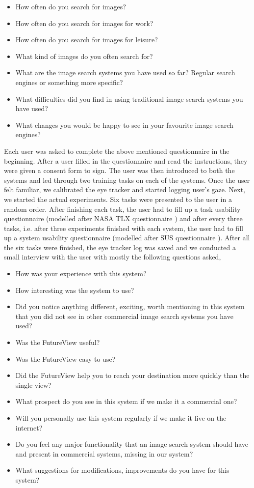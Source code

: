 \documentclass[english]{tktltiki}
\begin{document}
\begin{itemize}
	\item How often do you search for images?
	\item How often do you search for images for work?
	\item How often do you search for images for leisure?
	\item What kind of images do you often search for?
	\item What are the image search systems you have used so far? Regular search engines or something more specific?
	\item What difficulties did you find in using traditional image search systems you have used?
	\item What changes you would be happy to see in your favourite image search engines?
\end{itemize}


Each user was asked to complete the above mentioned questionnaire in the beginning. After a user filled in the questionnaire and read the instructions, they were given a consent form to sign. The user was then introduced to both the systems and led through two training tasks on each of the systems. Once the user felt familiar, we calibrated the eye tracker and started logging user's gaze. Next, we started the actual experiments. Six tasks were presented to the user in a random order. After finishing each task, the user had to fill up a task usability questionnaire (modelled after NASA TLX questionnaire \cite{NASA_TLX}) and after every three tasks, i.e. after three experiments finished with each system, the user had to fill up a system usability questionnaire (modelled after SUS questionnaire \cite{sus}). After all the six tasks were finished, the eye tracker log was saved and we conducted a small interview with the user with mostly the following questions asked,

\begin{itemize}
	\item How was your experience with this system?
	\item How interesting was the system to use?
	\item Did you notice anything different, exciting, worth mentioning in this system that you did not see in other commercial image search systems you have used?
	\item Was the FutureView useful?
	\item Was the FutureView easy to use?
	\item Did the FutureView help you to reach your destination more quickly than the single view?
	\item What prospect do you see in this system if we make it a commercial one?
	\item Will you personally use this system regularly if we make it live on the internet?
	\item Do you feel any major functionality that an image search system should have and present in commercial systems, missing in our system?
	\item What suggestions for modifications, improvements do you have for this system?
\end{itemize}
\end{document}

